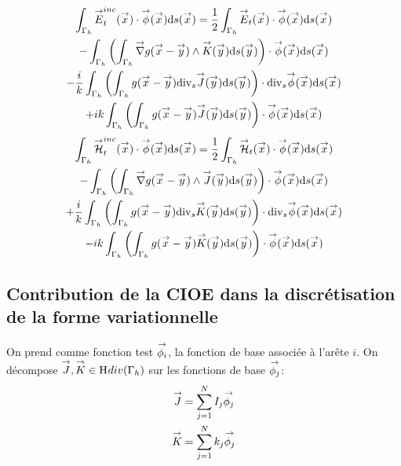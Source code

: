     \begin{multline}
      \label{eq:form_int:EFIE:var}
      \int_{\Gamma_h} \vE^{inc}_t(\vx) \cdot \vect{\phi}(\vx) \dd{s}(\vx) =
        \frac{1}{2} \int_{\Gamma_h} \vE_t(\vx) \cdot \vect{\phi}(\vx) \dd{s}(\vx) \\
          - \int_{\Gamma_h} \left( \int_{\Gamma_h} \vgrad g(\vx - \vy) \pvect \vK(\vy) \dd{s}(\vy) \right) \cdot \vect{\phi}(\vx) \dd{s}(\vx) \\
        - \frac{i}{k} \int_{\Gamma_h} \left( \int_{\Gamma_h}  g(\vx - \vy)\tdivs\vJ(\vy) \dd{s}(\vy) \right) \cdot \tdivs \vect{\phi}(\vx) \dd{s}(\vx) \\
          +  ik\int_{\Gamma_h} \left( \int_{\Gamma_h} g(\vx - \vy)\vJ(\vy) \dd{s}(\vy) \right) \cdot \vect{\phi}(\vx) \dd{s}(\vx)
    \end{multline}
    \begin{multline}
      \label{eq:form_int:MFIE:var}
      \int_{\Gamma_h} \vH^{inc}_t(\vx) \cdot \vect{\phi}(\vx) \dd{s}(\vx) =
        \frac{1}{2} \int_{\Gamma_h} \vH_t(\vx) \cdot \vect{\phi}(\vx) \dd{s}(\vx) \\
          - \int_{\Gamma_h} \left( \int_{\Gamma_h} \vgrad g(\vx - \vy) \pvect \vJ(\vy) \dd{s}(\vy) \right) \cdot \vect{\phi}(\vx) \dd{s}(\vx) \\
        + \frac{i}{k} \int_{\Gamma_h} \left( \int_{\Gamma_h}  g(\vx - \vy)\tdivs\vK(\vy) \dd{s}(\vy) \right) \cdot \tdivs \vect{\phi}(\vx) \dd{s}(\vx) \\
          -  ik\int_{\Gamma_h} \left( \int_{\Gamma_h} g(\vx - \vy)\vK(\vy) \dd{s}(\vy) \right) \cdot \vect{\phi}(\vx) \dd{s}(\vx)
    \end{multline}


  \subsection{Contribution de la CIOE dans la discrétisation de la forme variationnelle}


    On prend comme fonction test \({\overset{\rightarrow}{\phi_i}}\), la fonction de base associée à l'arête \(i\).
    On décompose \({\overset{\rightarrow}{J}},{\overset{\rightarrow}{K}} \in \mathrm{H}_\mathrm{{}}{div}(\Gamma_h)\) sur les fonctions de base \({\overset{\rightarrow}{\phi_j}}\):
    \begin{subequations}
      \begin{align}
        {\overset{\rightarrow}{J}} & = \sum_{j=1}^N I_j {\overset{\rightarrow}{\phi_j}}\\
        {\overset{\rightarrow}{K}} & = \sum_{j=1}^N k_j {\overset{\rightarrow}{\phi_j}}
      \end{align}
    \end{subequations}

